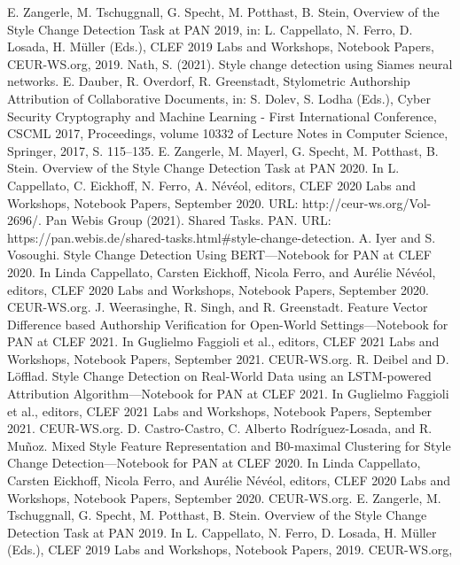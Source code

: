 \documentclass[conference]{IEEEtran}
\begin{document}
\begin{thebibliography}{00}
	 E. Zangerle, M. Tschuggnall, G. Specht, M. Potthast, B. Stein, Overview of the Style Change Detection Task at PAN 2019, in: L. Cappellato, N. Ferro, D. Losada, H. Müller (Eds.), CLEF 2019 Labs and Workshops, Notebook Papers, CEUR-WS.org, 2019.
	 Nath, S. (2021).  Style change detection using Siames neural networks.
	 E. Dauber, R. Overdorf, R. Greenstadt, Stylometric Authorship Attribution of Collaborative Documents, in: S. Dolev, S. Lodha (Eds.), Cyber Security Cryptography and Machine Learning - First International Conference, CSCML 2017, Proceedings, volume 10332 of Lecture Notes in Computer Science, Springer, 2017, S. 115–135.
	 E. Zangerle, M. Mayerl, G. Specht, M. Potthast, B. Stein. Overview of the Style Change Detection Task at PAN 2020. In L. Cappellato, C. Eickhoff, N. Ferro, A. Névéol, editors, CLEF 2020 Labs and Workshops, Notebook Papers, September 2020. URL: http://ceur-ws.org/Vol-2696/.
	 Pan Webis Group (2021). Shared Tasks. PAN. URL: https://pan.webis.de/shared-tasks.html\#style-change-detection.
	 A. Iyer and S. Vosoughi. Style Change Detection Using BERT—Notebook for PAN at CLEF 2020. In Linda Cappellato, Carsten Eickhoff, Nicola Ferro, and Aurélie Névéol, editors, CLEF 2020 Labs and Workshops, Notebook Papers, September 2020. CEUR-WS.org.
	 J. Weerasinghe, R. Singh, and R. Greenstadt. Feature Vector Difference based Authorship Verification for Open-World Settings—Notebook for PAN at CLEF 2021. In Guglielmo Faggioli et al., editors, CLEF 2021 Labs and Workshops, Notebook Papers, September 2021. CEUR-WS.org.
	 R. Deibel and D. Löfflad. Style Change Detection on Real-World Data using an LSTM-powered Attribution Algorithm—Notebook for PAN at CLEF 2021. In Guglielmo Faggioli et al., editors, CLEF 2021 Labs and Workshops, Notebook Papers, September 2021. CEUR-WS.org.
	 D. Castro-Castro, C. Alberto Rodríguez-Losada, and R. Muñoz. Mixed Style Feature Representation and B0-maximal Clustering for Style Change Detection—Notebook for PAN at CLEF 2020. In Linda Cappellato, Carsten Eickhoff, Nicola Ferro, and Aurélie Névéol, editors, CLEF 2020 Labs and Workshops, Notebook Papers, September 2020. CEUR-WS.org.
	 E. Zangerle, M. Tschuggnall, G. Specht, M. Potthast, B. Stein. Overview of the Style Change Detection Task at PAN 2019. In L. Cappellato, N. Ferro, D. Losada, H. Müller (Eds.), CLEF 2019 Labs and Workshops, Notebook Papers, 2019. CEUR-WS.org,

\end{thebibliography}
\end{document}
